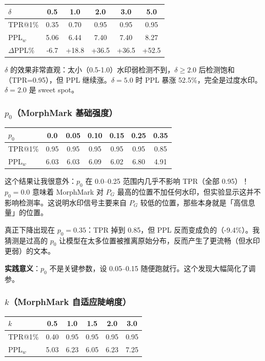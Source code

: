 \documentclass[11pt,a4paper]{article}
\begin{document}
\begin{table}[H]
\centering
\begin{tabular}{@{}lccccc@{}}
\toprule
$\delta$ & 0.5 & 1.0 & 2.0 & 3.0 & 5.0 \\
\midrule
TPR@1\% & 0.35 & 0.70 & 0.95 & 0.95 & 0.95 \\
PPL$_w$ & 5.06 & 6.44 & 7.40 & 7.40 & 8.27 \\
$\Delta$PPL\% & -6.7 & +18.8 & +36.5 & +36.5 & +52.5 \\
\bottomrule
\end{tabular}
\end{table}

$\delta$ 的效果非常直观：太小（0.5-1.0）水印弱检测不到，$\delta \ge 2.0$ 后检测饱和（TPR=0.95），但 PPL 继续涨。$\delta=5.0$ 时 PPL 暴涨 52.5\%，完全是过度水印。$\delta=2.0$ 是 sweet spot。

\subsubsection*{$p_0$（MorphMark 基础强度）}

\begin{table}[H]
\centering
\begin{tabular}{@{}lcccccc@{}}
\toprule
$p_0$ & 0.0 & 0.05 & 0.10 & 0.15 & 0.25 & 0.35 \\
\midrule
TPR@1\% & 0.95 & 0.95 & 0.95 & 0.95 & 0.95 & 0.85 \\
PPL$_w$ & 6.03 & 6.03 & 6.09 & 6.02 & 6.80 & 4.91 \\
\bottomrule
\end{tabular}
\end{table}

这个结果让我很意外：$p_0$ 在 0.0--0.25 范围内几乎不影响 TPR（全部 0.95）！$p_0=0.0$ 意味着 MorphMark 对 $P_G$ 最高的位置不加任何水印，但实验显示这并不影响检测率。这说明水印信号主要来自 $P_G$ 较低的位置，那些本身就是「高信息量」的位置。

真正下降出现在 $p_0=0.35$：TPR 掉到 0.85，但 PPL 反而变成负的（-9.4\%）。我猜测是过高的 $p_0$ 让模型在太多位置被推离原始分布，反而产生了更流畅（但水印更弱）的文本。

\textbf{实践意义}：$p_0$ 不是关键参数，设 0.05--0.15 随便跑就行。这个发现大幅简化了调参。

\subsubsection*{$k$（MorphMark 自适应陡峭度）}

\begin{table}[H]
\centering
\begin{tabular}{@{}lccccc@{}}
\toprule
$k$ & 0.5 & 1.0 & 1.5 & 2.0 & 3.0 \\
\midrule
TPR@1\% & 0.40 & 0.95 & 0.95 & 0.95 & 0.95 \\
PPL$_w$ & 5.03 & 6.23 & 6.05 & 6.23 & 7.25 \\
\bottomrule
\end{tabular}
\end{table}
\end{document}
